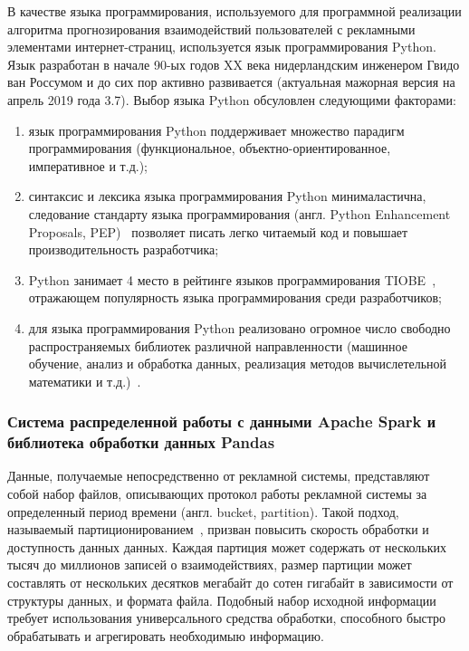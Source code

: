 В качестве языка программирования, используемого для программной реализации алгоритма прогнозирования взаимодействий пользователей
с рекламными элементами интернет-страниц, используется язык программирования Python. Язык разработан в начале 90-ых годов
XX века нидерландским инженером Гвидо ван Россумом и до сих пор активно развивается (актуальная мажорная версия на апрель 
2019 года 3.7). Выбор языка Python обсуловлен следующими факторами:
\begin{enumerate}
    \item язык программирования Python поддерживает множество парадигм программирования (функциональное, объектно-ориентированное,
    императивное и т.д.);
    \item синтаксис и лексика языка программирования Python минималастична, следование стандарту языка программирования 
    (англ. Python Enhancement Proposals, PEP)~\autocite{impl:pep} позволяет писать легко читаемый код и повышает 
    производительность разработчика;
    \item Python занимает 4 место в рейтинге языков программирования TIOBE~\autocite{impl:rating}, отражающем популярность 
    языка программирования среди разработчиков;
    \item для языка программирования Python реализовано огромное число свободно распространяемых библиотек различной 
    направленности (машинное обучение, анализ и обработка данных, реализация методов вычислетельной математики и 
    т.д.)~\autocite{impl:awesome-python}.
\end{enumerate}

\subsubsection{Система распределенной работы с данными Apache Spark и библиотека обработки данных Pandas}

Данные, получаемые непосредственно от рекламной системы, представляют собой набор файлов, описывающих протокол работы
рекламной системы за определенный период времени (англ. bucket, partition). Такой подход, 
называемый партиционированием~\autocite{impl:partioning}, призван повысить скорость обработки и доступность
данных данных. Каждая партиция может содержать от нескольких тысяч до миллионов записей о взаимодействиях, размер
партиции может составлять от нескольких десятков мегабайт до сотен гигабайт в зависимости от структуры данных,
и формата файла. Подобный набор исходной информации требует использования универсального средства обработки, способного
быстро обрабатывать и агрегировать необходимыю информацию.

